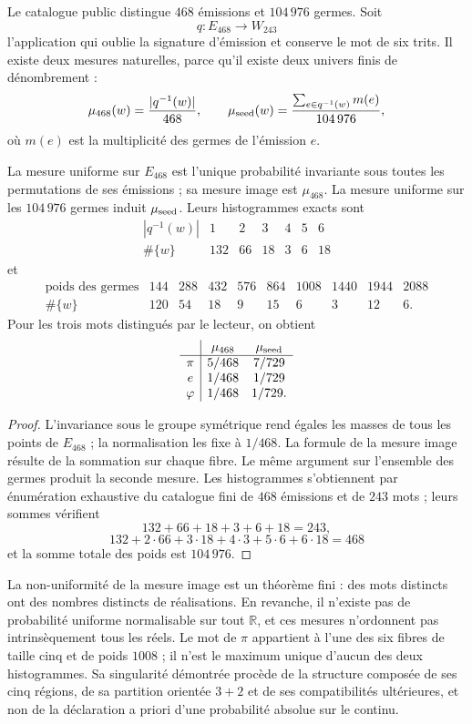 Le catalogue public distingue \(468\) émissions et \(104\,976\) germes.
Soit
\[
 q:E_{468}\longrightarrow W_{243}
\]
l'application qui oublie la signature d'émission et conserve le mot de six
trits. Il existe deux mesures naturelles, parce qu'il existe deux univers finis de dénombrement :
\[
 \mu_{468}(w)=\frac{|q^{-1}(w)|}{468},
 \qquad
 \mu_{\rm seed}(w)=
 \frac{\sum_{e\in q^{-1}(w)}m(e)}{104\,976},
\]
où \(m(e)\) est la multiplicité des germes de l'émission \(e\).

\begin{theorem}
\label{thm:medidas-emisor-468}
La mesure uniforme sur \(E_{468}\) est l'unique probabilité invariante sous
toutes les permutations de ses émissions ; sa mesure image est \(\mu_{468}\).
La mesure uniforme sur les \(104\,976\) germes induit
\(\mu_{\rm seed}\). Leurs histogrammes exacts sont
\[
\begin{array}{c|rrrrrr}
|q^{-1}(w)|&1&2&3&4&5&6\\ \hline
\#\{w\}&132&66&18&3&6&18
\end{array}
\]
et
\[
\begin{array}{c|rrrrrrrrr}
\text{poids des germes}
&144&288&432&576&864&1008&1440&1944&2088\\ \hline
\#\{w\}
&120&54&18&9&15&6&3&12&6.
\end{array}
\]
Pour les trois mots distingués par le lecteur, on obtient
\[
\begin{array}{c|cc}
&\mu_{468}&\mu_{\rm seed}\\ \hline
\pi&5/468&7/729\\
e&1/468&1/729\\
\varphi&1/468&1/729.
\end{array}
\]
\end{theorem}

\begin{proof}
L'invariance sous le groupe symétrique rend égales les masses de tous les
points de \(E_{468}\) ; la normalisation les fixe à \(1/468\). La formule de
la mesure image résulte de la sommation sur chaque fibre. Le même argument sur
l'ensemble des germes produit la seconde mesure. Les histogrammes s'obtiennent
par énumération exhaustive du catalogue fini de \(468\) émissions et de \(243\)
mots ; leurs sommes vérifient
\[
132+66+18+3+6+18=243,
\]
\[
132+2\cdot66+3\cdot18+4\cdot3+5\cdot6+6\cdot18=468
\]
et la somme totale des poids est \(104\,976\).
\end{proof}

La non-uniformité de la mesure image est un théorème fini : des mots distincts
ont des nombres distincts de réalisations. En revanche, il n'existe pas de
probabilité uniforme normalisable sur tout \(\mathbb R\), et ces mesures
n'ordonnent pas intrinsèquement tous les réels. Le mot de \(\pi\) appartient
à l'une des six fibres de taille cinq et de poids \(1008\) ; il n'est le maximum
unique d'aucun des deux histogrammes. Sa singularité démontrée procède
de la structure composée de ses cinq régions, de sa partition orientée
\(3+2\) et de ses compatibilités ultérieures, et non de la déclaration a priori d'une
probabilité absolue sur le continu.


